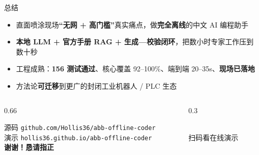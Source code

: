 \documentclass[aspectratio=169,fontset=none,11pt]{ctexbeamer}
\begin{document}
\begin{frame}{总结}
\begin{itemize}
  \item 直面喷涂现场\textbf{“无网 + 高门槛”}真实痛点，做\textbf{完全离线}的中文 AI 编程助手
  \item \textbf{本地 LLM + 官方手册 RAG + 生成—校验闭环}，把数小时专家工作压到数十秒
  \item 工程成熟：\textbf{156 测试通过}、核心覆盖 92–100\%、端到端 20–35s、\textbf{现场已落地}
  \item 方法论\textbf{可迁移}到更广的封闭工业机器人 / PLC 生态
\end{itemize}
\vfill
\begin{columns}[c]
\begin{column}{0.66\textwidth}
\begin{center}
{\color{abbgray}\small 源码 \texttt{github.com/Hollis36/abb-offline-coder}\\[2pt]
演示 \texttt{hollis36.github.io/abb-offline-coder}}\\[10pt]
{\Large\bfseries\color{abbred} 谢谢！恳请指正}
\end{center}
\end{column}
\begin{column}{0.3\textwidth}
\begin{center}
\\[4pt]
{\scriptsize\color{abbgray}扫码看在线演示}
\end{center}
\end{column}
\end{columns}
\end{frame}
\end{document}
